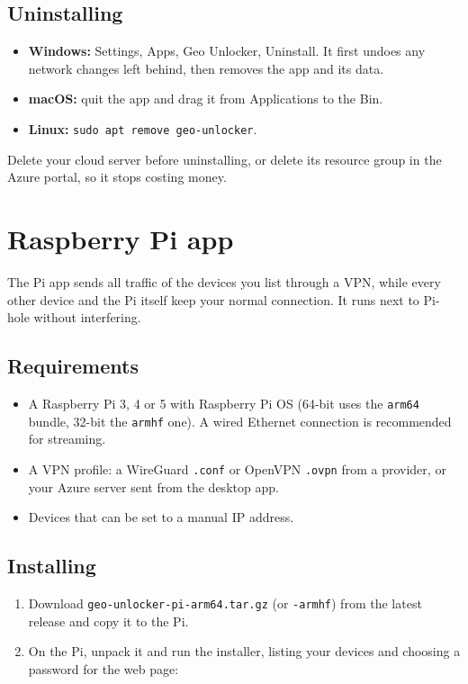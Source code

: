 \documentclass[11pt,a4paper]{article}
\newcommand{\file}[1]{\texttt{#1}}          %
\begin{document}
\subsection{Uninstalling}

\begin{itemize}
  \item \textbf{Windows:} Settings, Apps, Geo Unlocker, Uninstall. It first undoes any network changes left behind, then removes the app and its data.
  \item \textbf{macOS:} quit the app and drag it from Applications to the Bin.
  \item \textbf{Linux:} \file{sudo apt remove geo-unlocker}.
\end{itemize}

Delete your cloud server before uninstalling, or delete its resource group in the Azure portal, so it stops costing money.

\section{Raspberry Pi app}

The Pi app sends all traffic of the devices you list through a VPN, while every other device and the Pi itself keep your normal connection. It runs next to Pi-hole without interfering.

\subsection{Requirements}

\begin{itemize}
  \item A Raspberry Pi 3, 4 or 5 with Raspberry Pi OS (64-bit uses the \file{arm64} bundle, 32-bit the \file{armhf} one). A wired Ethernet connection is recommended for streaming.
  \item A VPN profile: a WireGuard \file{.conf} or OpenVPN \file{.ovpn} from a provider, or your Azure server sent from the desktop app.
  \item Devices that can be set to a manual IP address.
\end{itemize}

\subsection{Installing}

\begin{enumerate}
  \item Download \file{geo-unlocker-pi-arm64.tar.gz} (or \file{-armhf}) from the latest release and copy it to the Pi.
  \item On the Pi, unpack it and run the installer, listing your devices and choosing a password for the web page:
\end{enumerate}
\end{document}
